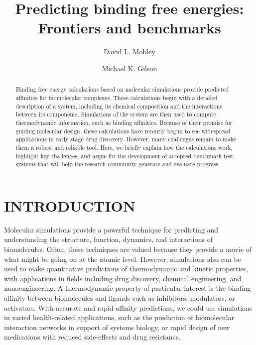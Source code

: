 \documentclass[aps,pre,twocolumn,nofootinbib,superscriptaddress,10pt, final,tightenlines]{revtex4-1}
\begin{document}
\title{Predicting binding free energies: Frontiers and benchmarks}


\author{David L. Mobley}
\author{Michael K. Gilson}


\begin{abstract}
Binding free energy calculations based on molecular simulations provide predicted affinities for biomolecular complexes. 
These calculations begin with a detailed description of a system, including its chemical composition and the interactions between its components. 
Simulations of the system are then used to compute thermodynamic information, such as binding affinities. Because of their promise for guiding molecular design, these calculations have recently begun to see widespread applications in early stage drug discovery. However, many challenges remain to make them a robust and reliable tool. Here, we briefly explain how the calculations work, highlight key challenges, and argue for the development of accepted benchmark test systems that will help the research community generate and evaluate progress.
\end{abstract}

\maketitle



\section{INTRODUCTION}

Molecular simulations provide a powerful technique for predicting and understanding the structure, function, dynamics, and interactions of biomolecules. 
Often, these techniques are valued because they provide a movie of what might be going on at the atomic level. 
However, simulations also can be used to make quantitative predictions of thermodynamic and kinetic properties, with applications in fields including drug discovery, chemical engineering, and nanoengineering. 
A thermodynamic property of particular interest is the binding affinity between biomolecules and ligands such as inhibitors, modulators, or activators. 
With accurate and rapid affinity predictions, we could use simulations in varied health-related applications, such as the prediction of biomolecular interaction networks in support of systems biology, or rapid design of new medications with reduced side-effects and drug resistance.
\end{document}
